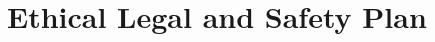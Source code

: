 \documentclass{article}
\begin{document}
\section{Ethical Legal and Safety Plan}


\printbibliography
\end{document}
